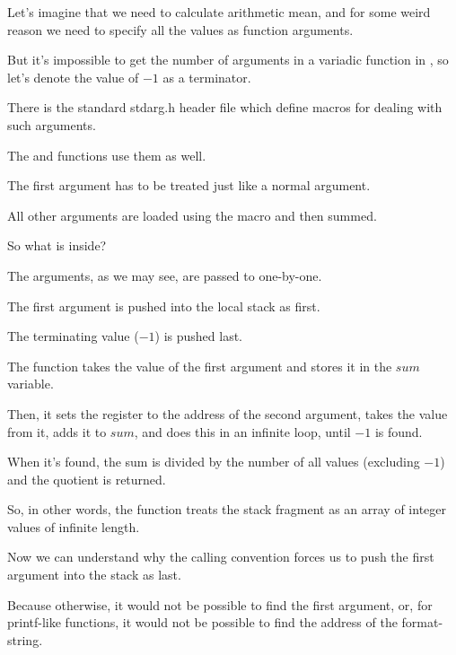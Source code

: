 
Let's imagine that we need to calculate \gls{arithmetic mean}, and for some weird reason 
we need to specify all the values as function arguments.

But it's impossible to get the number of arguments in a variadic function in \CCpp, so let's denote 
the value of $-1$ as a terminator.


There is the standard stdarg.h header file which define macros for dealing with such arguments.

The \printf and \scanf functions use them as well.



The first argument has to be treated just like a normal argument.

All other arguments are loaded using the  macro and then summed.

So what is inside?




The arguments, as we may see, are passed to \main one-by-one.

The first argument is pushed into the local stack as first.

The terminating value ($-1$) is pushed last.

The  function takes the value of the first argument and stores it in the $sum$ variable.

Then, it sets the \EDX register to the address of the second argument, takes the value from it, adds it to $sum$,
and does this in an infinite loop, until $-1$ is found.

When it's found, the sum is divided by the number of all values (excluding $-1$) and the \gls{quotient} is returned.

So, in other words, the function treats the stack fragment as an array of integer values of infinite
length.

Now we can understand why the  calling convention forces us to push the first argument 
into the stack as last.

Because otherwise, it would not be possible to find the first argument, 
or, for printf-like functions, it would not be possible to find the address of the format-string.

